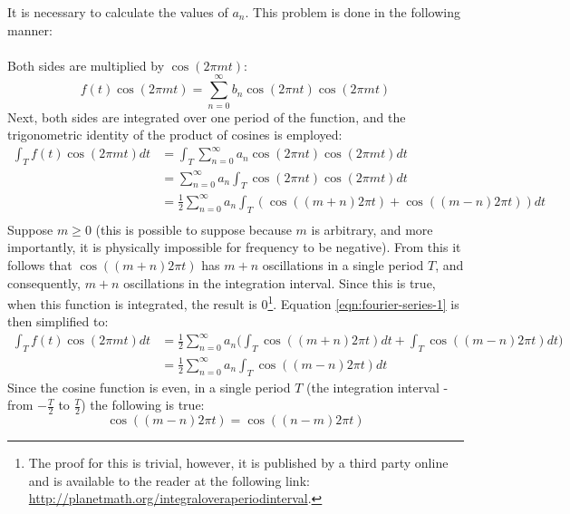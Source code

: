 \documentclass{article}
\begin{document}
It is necessary to calculate the values of $a_n$. This problem is done in the 
following manner:

\paragraph*{}
Both sides are multiplied by $\cos(2 \pi m t)$:
$$f(t) \cos(2 \pi m t) = \sum^{\infty}_{n=0}b_n \cos(2 \pi n t) \cos(2 \pi m t)$$
Next, both sides are integrated over one period of the function, and the 
trigonometric identity of the product of cosines is employed:
\begin{equation}
	\begin{aligned}
		\int_{T} f(t) \cos(2 \pi m t) dt &= 
		\int_{T} \sum^{\infty}_{n=0} a_n \cos(2 \pi n t) \cos(2 \pi m t) dt \\
		&= \sum^{\infty}_{n=0} a_n \int_{T} \cos(2 \pi n t) \cos(2 \pi m t) dt \\
		&= \frac{1}{2} \sum^{\infty}_{n=0} a_n \int_{T} (\cos( (m + n) 2 \pi t) + \cos( (m - n) 2 \pi t)) dt \\
	\end{aligned}
	\label{eqn:fourier-series-1}
\end{equation}
Suppose $m \geq 0$ (this is possible to suppose because $m$ is arbitrary, and 
more importantly, it is physically impossible for frequency to be negative). 
From this it follows that $\cos( (m + n) 2 \pi t)$ has $m + n$ oscillations 
in a single period $T$, and consequently, $m + n$ oscillations in the 
integration interval. Since this is true, when this function is integrated, 
the result is $0$\footnote{The proof for this is trivial, however, it is 
published by a third party online and is available to the reader at the 
following link: \url{http://planetmath.org/integraloveraperiodinterval}.}. 
Equation \ref{eqn:fourier-series-1} is then simplified to:
\begin{equation}
	\begin{aligned}
		\int_{T} f(t) \cos(2 \pi m t) dt &=
		\frac{1}{2} \sum^{\infty}_{n=0} a_n \bigg(\int_{T} \cos( (m + n) 2 \pi t) dt + 
		\int_{T} \cos( (m - n) 2 \pi t) dt \bigg) \\
		&= \frac{1}{2} \sum^{\infty}_{n=0} a_n \int_{T} \cos( (m - n) 2 \pi t) dt
	\end{aligned}
	\label{eqn:fourier-series-2}
\end{equation}
Since the cosine function is even, in a single period $T$ (the integration 
interval - from $-\frac{T}{2}$ to $\frac{T}{2}$) the following is true:
$$\cos( (m - n) 2 \pi t) = \cos( (n - m) 2 \pi t)$$
\end{document}
